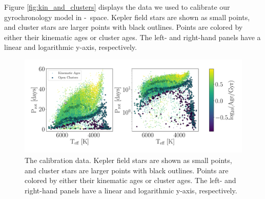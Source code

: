 
Figure \ref{fig:kin_and_clusters} displays the data we used to calibrate our
gyrochronology model in \prot-\teff\ space.
Kepler field stars are shown as small points, and cluster stars are larger
points with black outlines.
Points are colored by either their kinematic ages or cluster ages.
The left- and right-hand panels have a linear and logarithmic y-axis,
respectively.

\begin{figure}
\caption{
    The calibration data.
Kepler field stars are shown as small points, and cluster stars are larger
points with black outlines.
Points are colored by either their kinematic ages or cluster ages.
The left- and right-hand panels have a linear and logarithmic y-axis,
respectively.
}
  \centering \includegraphics[width=1\textwidth]{kin_and_clusters_log_lin}
\end{figure}
